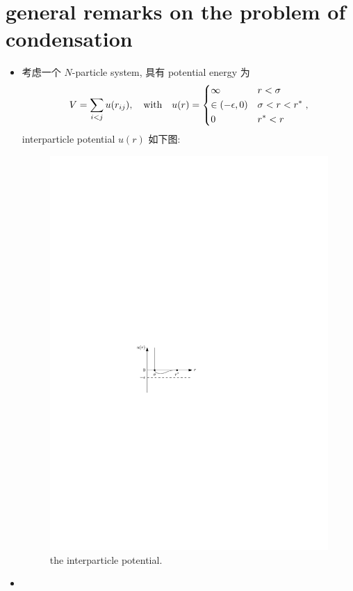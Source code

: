 \section{general remarks on the problem of condensation}
\begin{itemize}
	\item 考虑一个 $N$-particle system, 具有 potential energy 为
	\begin{equation}
		V = \sum_{i < j} u(r_{i j}), \quad \text{with} \quad u(r) = \begin{dcases}
			\infty & r < \sigma \\
			\in (- \epsilon, 0) & \sigma < r < r^* \\
			0 & r^* < r
		\end{dcases},
	\end{equation}
	interparticle potential $u(r)$ 如下图:
	
	\begin{figure}[H]
		\centering
		\includegraphics[scale=1]{figures/the interparticle potential.pdf}
		\caption{the interparticle potential.}
	\end{figure}
	
	\item 
\end{itemize}
